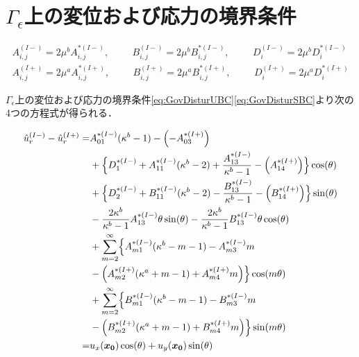 \section{$\Gamma_{\epsilon}$上の変位および応力の境界条件}

\begin{align}
A_{i,j}^{(I-)}=2\mu^{b}A_{i,j}^{*(I-)},\hspace{1cm}B_{i,j}^{(I-)}=2\mu^{b}B_{i,j}^{*(I-)},\hspace{1cm}D_{i}^{(I-)}=2\mu^{b}D_{i}^{*(I-)}
\nonumber
\\
A_{i,j}^{(I+)}=2\mu^{a}A_{i,j}^{*(I+)},\hspace{1cm}B_{i,j}^{(I+)}=2\mu^{a}B_{i,j}^{*(I+)},\hspace{1cm}D_{i}^{(I+)}=2\mu^{a}D_{i}^{*(I+)}
\label{eq:ChangeCoef}
\end{align}

$\Gamma_{\epsilon}$上の変位および応力の境界条件\eqref{eq:GovDisturUBC}\eqref{eq:GovDisturSBC}より次の4つの方程式が得られる．

\begin{align}
	\hat{u}_{r}^{(I-)}-\hat{u}_{r}^{(I+)} =&A_{01}^{*(I-)}(\kappa^{b}-1)-\Bigl(-A_{03}^{*(I+)}\Bigr)
	\nonumber
	\\
	&+\Bigl\{D_{1}^{*(I-)}+A_{11}^{*(I-)}(\kappa^{b}-2)+\frac{A_{13}^{*(I-)}}{\kappa^{b}-1}
	-\Bigl(A_{14}^{*(I+)}\Bigr)\Bigr\}\cos(\theta)
	\nonumber
	\\
	&+\Bigl\{D_{2}^{*(I-)}+B_{11}^{*(I-)}(\kappa^{b}-2)-\frac{B_{13}^{*(I-)}}{\kappa^{b}-1}
	-\Bigl(B_{14}^{*(I+)}\Bigr)\Bigr\}\sin(\theta)
	\nonumber
	\\
	&-\frac{2\kappa^{b}}{\kappa^{b}-1}A_{13}^{*(I-)}\theta\sin(\theta)
	-\frac{2\kappa^{b}}{\kappa^{b}-1}B_{13}^{*(I-)}\theta\cos(\theta)
	\nonumber
	\\
	&+\sum_{m=2}^{\infty}\Bigl\{A_{m1}^{*(I-)}(\kappa^{b}-m-1)
	-A_{m3}^{*(I-)}m
	\nonumber
	\\
	&-\Bigl(A_{m2}^{*(I+)}(\kappa^{a}+m-1)
	+A_{m4}^{*(I+)}m\Bigr)\Bigr\}\cos(m\theta)
	\nonumber
	\\
	&+\sum_{m=2}^{\infty}\Bigl\{B_{m1}^{*(I-)}(\kappa^{b}-m-1)
	-B_{m3}^{*(I-)}m
	\nonumber
	\\
	&-\Bigl(B_{m2}^{*(I+)}(\kappa^{a}+m-1)
	+B_{m4}^{*(I+)}m\Bigr)\Bigr\}\sin(m\theta)
	\nonumber
	\\
	=&u_{x}(\bm{x_{0}})\cos(\theta)+u_{y}(\bm{x_{0}})\sin(\theta)
	\label{eq:UR1eq}
\end{align}

